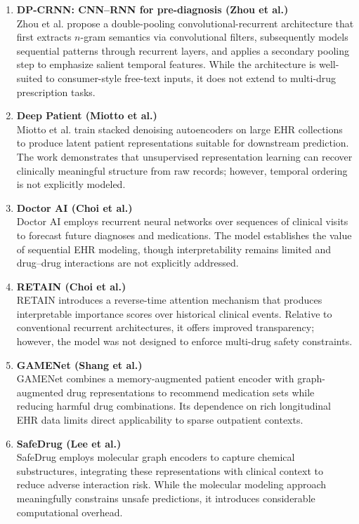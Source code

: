 \begin{enumerate}[label=\textbf{\arabic*.}]
    \item \textbf{DP-CRNN: CNN--RNN for pre-diagnosis (Zhou et al.)} \\
    Zhou et al. propose a double-pooling convolutional-recurrent architecture that first extracts $n$-gram semantics via convolutional filters, subsequently models sequential patterns through recurrent layers, and applies a secondary pooling step to emphasize salient temporal features. While the architecture is well-suited to consumer-style free-text inputs, it does not extend to multi-drug prescription tasks.

    \item \textbf{Deep Patient (Miotto et al.)} \\
    Miotto et al. train stacked denoising autoencoders on large EHR collections to produce latent patient representations suitable for downstream prediction. The work demonstrates that unsupervised representation learning can recover clinically meaningful structure from raw records; however, temporal ordering is not explicitly modeled.

    \item \textbf{Doctor AI (Choi et al.)} \\
    Doctor AI employs recurrent neural networks over sequences of clinical visits to forecast future diagnoses and medications. The model establishes the value of sequential EHR modeling, though interpretability remains limited and drug--drug interactions are not explicitly addressed.

    \item \textbf{RETAIN (Choi et al.)} \\
    RETAIN introduces a reverse-time attention mechanism that produces interpretable importance scores over historical clinical events. Relative to conventional recurrent architectures, it offers improved transparency; however, the model was not designed to enforce multi-drug safety constraints.

    \item \textbf{GAMENet (Shang et al.)} \\
    GAMENet combines a memory-augmented patient encoder with graph-augmented drug representations to recommend medication sets while reducing harmful drug combinations. Its dependence on rich longitudinal EHR data limits direct applicability to sparse outpatient contexts.

    \item \textbf{SafeDrug (Lee et al.)} \\
    SafeDrug employs molecular graph encoders to capture chemical substructures, integrating these representations with clinical context to reduce adverse interaction risk. While the molecular modeling approach meaningfully constrains unsafe predictions, it introduces considerable computational overhead.


\end{enumerate}

